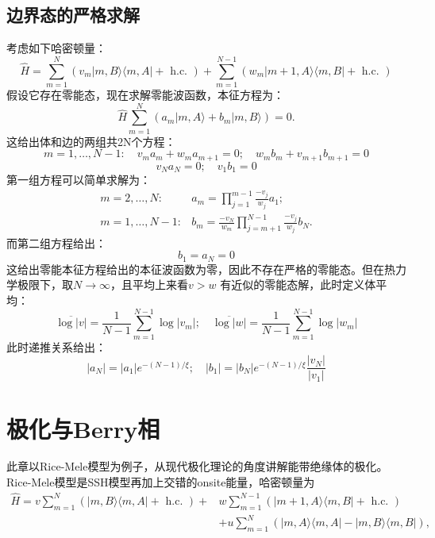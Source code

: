 \documentclass[12pt, a4paper, oneside]{ctexbook}
\begin{document}
\section{边界态的严格求解}
考虑如下哈密顿量：
\begin{equation}
	\hat{H}=\sum_{m=1}^N\left(v_m|m, B\rangle\langle m, A|+\text { h.c. }\right)+\sum_{m=1}^{N-1}\left(w_m|m+1, A\rangle\langle m, B|+\text { h.c. }\right)
\end{equation} 
假设它存在零能态，现在求解零能波函数，本征方程为：
\begin{equation}
	\hat{H} \sum_{m=1}^N\left(a_m|m, A\rangle+b_m|m, B\rangle\right)=0 .
\end{equation}
这给出体和边的两组共2N个方程：
\begin{equation}
	m=1, \ldots, N-1: \quad v_m a_m+w_m a_{m+1}=0 ; \quad w_m b_m+v_{m+1} b_{m+1}=0
\end{equation}
\begin{equation}
	v_N a_N=0 ; \quad v_1 b_1=0
\end{equation}
第一组方程可以简单求解为：
\begin{equation}
	\begin{array}{ll}
		m=2, \ldots, N: & a_m=\prod_{j=1}^{m-1} \frac{-v_j}{w_j} a_1 ; \\
		m=1, \ldots, N-1: & b_m=\frac{-v_N}{w_m} \prod_{j=m+1}^{N-1} \frac{-v_j}{w_j} b_N .
		\end{array}
\end{equation}
而第二组方程给出：
\begin{equation}
	b_1=a_N=0
\end{equation}
这给出零能本征方程给出的本征波函数为零，因此不存在严格的零能态。但在热力学极限下，取$ N\to\infty $，且平均上来看$ v>w $ 有近似的零能态解，此时定义体平均：
\begin{equation}
	\overline{\log |v|}=\frac{1}{N-1} \sum_{m=1}^{N-1} \log \left|v_m\right| ; \quad \overline{\log |w|}=\frac{1}{N-1} \sum_{m=1}^{N-1} \log \left|w_m\right|
\end{equation} 
此时递推关系给出：
\begin{equation}
	\left|a_N\right|=\left|a_1\right| e^{-(N-1) / \xi} ; \quad\left|b_1\right|=\left|b_N\right| e^{-(N-1) / \xi} \frac{\left|v_N\right|}{\left|v_1\right|}
\end{equation}
\chapter{极化与Berry相}
此章以Rice-Mele模型为例子，从现代极化理论的角度讲解能带绝缘体的极化。Rice-Mele模型是SSH模型再加上交错的onsite能量，哈密顿量为
\begin{equation}
	\begin{aligned}
		\hat{H}=v \sum_{m=1}^N(|m, B\rangle\langle m, A|+\text { h.c. })+ & w \sum_{m=1}^{N-1}(|m+1, A\rangle\langle m, B|+\text { h.c. }) \\
		& +u \sum_{m=1}^N(|m, A\rangle\langle m, A|-| m, B\rangle\langle m, B|),
		\end{aligned}
\end{equation}
\end{document}
